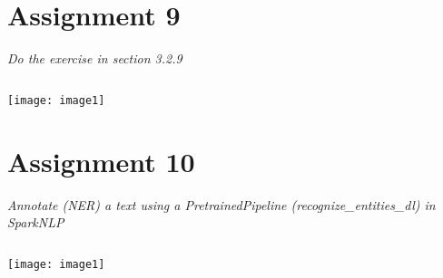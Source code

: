 \documentclass[]{article}
\begin{document}
\section*{Assignment 9}
\emph{ Do the exercise in section 3.2.9 }

\begin{verbatim}

\end{verbatim}
\texttt{[image: image1]} %


\section*{Assignment 10}
\emph{ Annotate (NER) a text using a PretrainedPipeline (recognize\_entities\_dl) in SparkNLP }

\begin{verbatim}

\end{verbatim}
\texttt{[image: image1]} %
\end{document}
